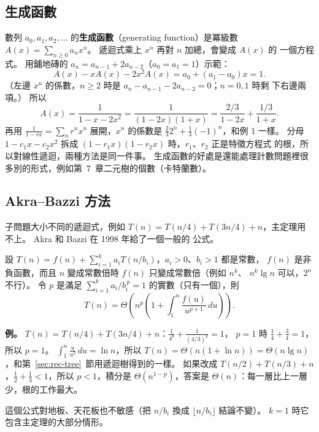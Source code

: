 \subsection{生成函數}

數列 $a_0, a_1, a_2, \ldots$ 的\textbf{生成函數}（generating function）是冪級數
$A(x) = \sum_{n \ge 0} a_n x^n$。 遞迴式乘上 $x^n$ 再對 $n$ 加總，會變成 $A(x)$ 的
一個方程式。 用鋪地磚的 $a_n = a_{n-1} + 2a_{n-2}$（$a_0 = a_1 = 1$）示範：
\[
A(x) - x A(x) - 2x^2 A(x) = a_0 + (a_1 - a_0) x = 1 .
\]
（左邊 $x^n$ 的係數，$n \ge 2$ 時是 $a_n - a_{n-1} - 2a_{n-2} = 0$；$n = 0, 1$ 時剩
下右邊兩項。） 所以
\[
A(x) = \frac{1}{1 - x - 2x^2} = \frac{1}{(1 - 2x)(1 + x)}
= \frac{2/3}{1 - 2x} + \frac{1/3}{1 + x}.
\]
再用 $\frac{1}{1 - rx} = \sum_n r^n x^n$ 展開，$x^n$ 的係數是
$\frac{2}{3} 2^n + \frac{1}{3}(-1)^n$，和例 1 一樣。 分母
$1 - c_1 x - c_2 x^2$ 拆成 $(1 - r_1 x)(1 - r_2 x)$ 時，$r_1$、$r_2$ 正是特徵方程式
的根，所以對線性遞迴，兩種方法是同一件事。 生成函數的好處是還能處理計數問題裡很
多別的形式，例如第~7~章二元樹的個數（卡特蘭數）。

\subsection{Akra--Bazzi 方法}

子問題大小不同的遞迴式，例如
$T(n) = T(n/4) + T(3n/4) + n$，主定理用不上。 Akra 和 Bazzi 在 1998 年給了一個一般的
公式。

\begin{theorem}
\label{thm:rec-akra}
設 $T(n) = f(n) + \sum_{i=1}^{k} a_i T(n/b_i)$，$a_i > 0$、$b_i > 1$ 都是常數，
$f(n)$ 是非負函數，而且 $n$ 變成常數倍時 $f(n)$ 只變成常數倍（例如 $n^k$、
$n^k \lg n$ 可以，$2^n$ 不行）。 令 $p$ 是滿足 $\sum_{i=1}^{k} a_i / b_i^{\,p} = 1$
的實數（只有一個），則
\[
T(n) = \Theta\!\left(n^{p} \left(1 + \int_{1}^{n} \frac{f(u)}{u^{p+1}}\, du\right)\right).
\]
\end{theorem}

\textbf{例。} $T(n) = T(n/4) + T(3n/4) + n$：$\frac{1}{4^p} + \frac{1}{(4/3)^p} = 1$，
$p = 1$ 時 $\frac{1}{4} + \frac{3}{4} = 1$，所以 $p = 1$。
$\int_1^n \frac{u}{u^2}\, du = \ln n$，所以 $T(n) = \Theta(n(1 + \ln n)) =
\Theta(n \lg n)$，和第~\ref{sec:rec-tree}~節用遞迴樹得到的一樣。 如果改成
$T(n/2) + T(n/3) + n$，$\frac{1}{2} + \frac{1}{3} < 1$，所以 $p < 1$，積分是
$\Theta(n^{1-p})$，答案是 $\Theta(n)$：每一層比上一層少，根的工作最大。

這個公式對地板、天花板也不敏感（把 $n/b_i$ 換成 $\lfloor n/b_i \rfloor$ 結論不變）。
$k = 1$ 時它包含主定理的大部分情形。

